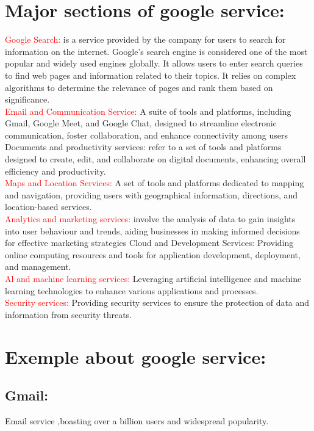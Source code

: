 \documentclass[a4paper,11pt]{report}
\begin{document}
\section{Major sections of google service:}
 \Large{}
 \textcolor{red}{Google Search:} is a service provided by the company for users to search for information on the internet. Google's search engine is considered one of the most popular and widely used engines globally. It allows users to enter search queries to find web pages and information related to their topics. It relies on complex algorithms to determine the relevance of pages and rank them based on significance.\\
\textcolor{red}{Email and Communication Service:} A suite of tools and platforms, including Gmail, Google Meet, and Google Chat, designed to streamline electronic communication, foster collaboration, and enhance connectivity among users
Documents and productivity services: refer to a set of tools and platforms designed to create, edit, and collaborate on digital documents, enhancing overall efficiency and productivity.\\
\textcolor{red}{Maps and Location Services:} A set of tools and platforms dedicated to mapping and navigation, providing users with geographical information, directions, and location-based services.\\
\textcolor{red}{Analytics and marketing services:} involve the analysis of data to gain insights into user behaviour and trends, aiding businesses in making informed decisions for effective marketing strategies
Cloud and Development Services: Providing online computing resources and tools for application development, deployment, and management.\\
\textcolor{red}{Al and machine learning services:} Leveraging artificial intelligence and machine learning technologies to enhance various applications and processes.\\
\textcolor{red}{Security services:} Providing security services to ensure the protection of data and information from security threats.\\
\section{Exemple about google service:}
\subsection{Gmail:}
Email service ,boasting over a billion users and widespread popularity.\\
\end{document}
